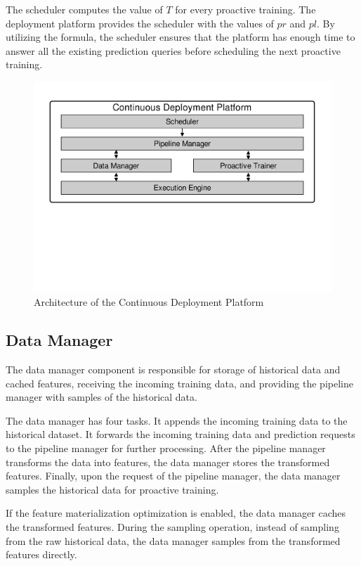 The scheduler computes the value of $T$ for every proactive training.
The deployment platform provides the scheduler with the values of $pr$ and $pl$. 
By utilizing the formula, the scheduler ensures that the platform has enough time to answer all the existing prediction queries before scheduling the next proactive training.
\begin{figure}[h]
\centering
\includegraphics[width=\columnwidth]{../images/system-architecture.pdf}
\caption{Architecture of the Continuous Deployment Platform}
\label{fig:system-architecture}
\end{figure}


\subsection{Data Manager} \label{data-manager}
The data manager component is responsible for storage of historical data and cached features, receiving the incoming training data, and providing the pipeline manager with samples of the historical data.

The data manager has four tasks.
It appends the incoming training data to the historical dataset.
It forwards the incoming training data and prediction requests to the pipeline manager for further processing.
After the pipeline manager transforms the data into features, the data manager stores the transformed features.
Finally, upon the request of the pipeline manager, the data manager samples the historical data for proactive training.

If the feature materialization optimization is enabled, the data manager caches the transformed features.
During the sampling operation, instead of sampling from the raw historical data, the data manager samples from the transformed features directly.

